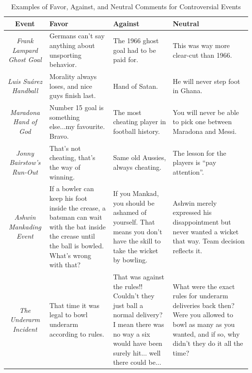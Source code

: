 \documentclass[sigconf, review]{acmart}
\begin{document}
\begin{table}[!htbp]
    \centering
    { %
      \renewcommand{\arraystretch}{1.2}%
      \setlength{\tabcolsep}{4pt}%
      \begin{tabular}{|c|p{4cm}|p{4cm}|p{4cm}|}
          \hline
          \textbf{Event} & \textbf{Favor} & \textbf{Against} & \textbf{Neutral} \\
          \hline
          {\textit{Frank Lampard Ghost Goal}} 
           & Germans can't say anything about unsporting behavior.  
           & The 1966 ghost goal had to be paid for. 
           & This was way more clear-cut than 1966. \\
          \hline
          {\textit{Luis Suárez Handball}} 
           & Morality always loses, and nice guys finish last.  
           & Hand of Satan. 
           & He will never step foot in Ghana. \\
          \hline
          {\textit{Maradona Hand of God}} 
           & Number 15 goal is something else...my favourite. Bravo. 
           & The most cheating player in football history. 
           & You will never be able to pick one between Maradona and Messi. \\
          \hline
          {\textit{Jonny Bairstow's Run-Out}} 
           & That’s not cheating, that’s the way of winning. 
           & Same old Aussies, always cheating. 
           & The lesson for the players is ``pay attention''. \\
          \hline
          {\textit{Ashwin Mankading Event}} 
           & If a bowler can keep his foot inside the crease, a batsman can wait with the bat inside the crease until the ball is bowled. What's wrong with that? 
           & If you Mankad, you should be ashamed of yourself. That means you don't have the skill to take the wicket by bowling. 
           & Ashwin merely expressed his disappointment but never wanted a wicket that way. Team decision reflects it. \\
          \hline
          {\textit{The Underarm Incident}} 
           & That time it was legal to bowl underarm according to rules. 
           & That was against the rules!! Couldn't they just ball a normal delivery? I mean there was no way a six would have been surely hit... well there could be... 
           & What were the exact rules for underarm deliveries back then? Were you allowed to bowl as many as you wanted, and if so, why didn't they do it all the time? \\
          \hline
      \end{tabular}
    } %
    \caption{Examples of Favor, Against, and Neutral Comments for Controversial Events}
    \label{tab:event_comments}
\end{table}
\end{document}
